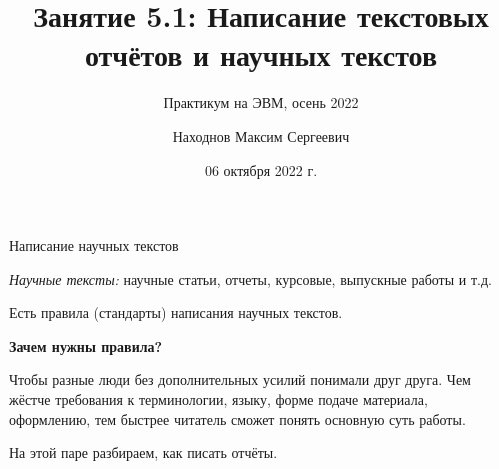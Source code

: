 \documentclass[fleqn, xcolor=x11names]{beamer}
\title[Введение в Python]{\bfseries Занятие 5.1: Написание текстовых отчётов и научных текстов}
\author[Находнов~М.\,С.]{Находнов Максим Сергеевич}
\subtitle{Практикум на ЭВМ, осень 2022}
\institute[OM]{кафедра ММП, ВМК МГУ}
\date{06 октября 2022 г.}
\begin{document}
\begin{frame}
    \maketitle
\end{frame}

\begin{frame}{Написание научных текстов}

\textsl{Научные тексты:} научные статьи, отчеты, курсовые, выпускные работы и т.д.

\hfill

Есть правила (стандарты) написания научных текстов.

\hfill

\textbf{Зачем нужны правила?}

Чтобы разные люди без дополнительных усилий понимали друг друга. Чем жёстче требования к терминологии, языку, форме подаче материала, оформлению, тем быстрее читатель сможет понять основную суть работы.

\hfill

На этой паре разбираем, как писать отчёты.
\end{frame}
\end{document}
